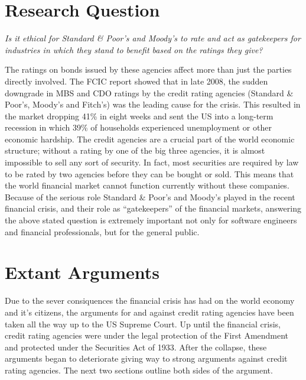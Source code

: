 \documentclass[11pt]{article}
\begin{document}
\begin{multicols}{2}

\section{Research Question}

\textit{Is it ethical for Standard \& Poor's and Moody's to rate and act as gatekeepers for industries in which they stand to benefit based on the ratings they give?}
\newline

The ratings on bonds issued by these agencies affect more than just the parties directly involved. The FCIC report showed that in late 2008, the sudden downgrade in MBS and CDO ratings by the credit rating agencies (Standard \& Poor's, Moody's and Fitch's) was the leading cause for the crisis. \cite{huffCreditCause, govtReport}  This resulted in the market dropping 41\% in eight weeks \cite{marketWatch} and sent the US into a long-term recession in which 39\% of households experienced unemployment or other economic hardship. \cite{collapseImpact}  The credit agencies are a crucial part of the world economic structure; without a rating by one of the big three agencies, it is almost impossible to sell any sort of security.  In fact, most securities are required by law to be rated by two agencies before they can be bought or sold. \cite{wpMoodies}  This means that the world financial market cannot function currently without these companies.  Because of the serious role Standard \& Poor's and Moody's played in the recent financial crisis, and their role as ``gatekeepers'' of the financial markets, answering the above stated question is extremely important not only for software engineers and financial professionals, but for the general public.    


\section{Extant Arguments}

Due to the sever consiquences the financial crisis has had on the world economy and it's citizens, the arguments for and against credit rating agencies have been taken all the way up to the US Supreme Court.  Up until the financial crisis, credit rating agencies were under the legal protection of the First Amendment and protected under the Securities Act of 1933.  After the collapse, these arguments began to deteriorate giving way to strong arguments against credit rating agencies.  The next two sections outline both sides of the argument.


\end{multicols}
\end{document}
